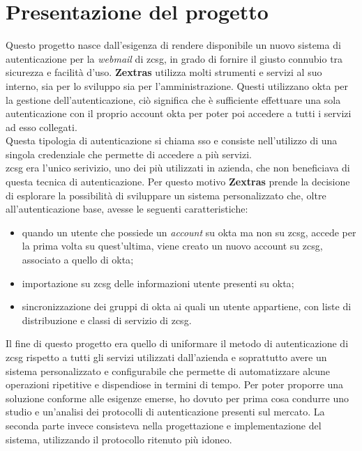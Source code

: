 \newpage

\section{Presentazione del progetto}\label{sec:progetto}
    Questo progetto nasce dall'esigenza di rendere disponibile un nuovo sistema di autenticazione per la \textit{webmail} di \gls{zcsg}, in grado di fornire il giusto connubio tra sicurezza e facilità d'uso. \textbf{Zextras} utilizza molti strumenti e servizi al suo interno, sia per lo sviluppo sia per l'amministrazione. Questi utilizzano \gls{okta} per la gestione dell'autenticazione, ciò significa che è sufficiente effettuare una sola autenticazione con il proprio account \gls{okta} per poter poi accedere a tutti i servizi ad esso collegati. \\
    Questa tipologia di autenticazione si chiama \gls{sso} e consiste nell'utilizzo di una singola credenziale che permette di accedere a più servizi. \\
    \gls{zcsg} era l'unico serivizio, uno dei più utilizzati in azienda, che non beneficiava di questa tecnica di autenticazione. Per questo motivo \textbf{Zextras} prende la decisione di esplorare la possibilità di sviluppare un sistema personalizzato che, oltre all'autenticazione base, avesse le seguenti caratteristiche:
    \begin{itemize}
        \item quando un utente che possiede un \textit{account} su \gls{okta} ma non su \gls{zcsg}, accede per la prima volta su quest'ultima, viene creato un nuovo account su \gls{zcsg}, associato a quello di \gls{okta};
        \item importazione su \gls{zcsg} delle informazioni utente presenti su \gls{okta};
        \item sincronizzazione dei gruppi di \gls{okta} ai quali un utente appartiene, con liste di distribuzione e classi di servizio di \gls{zcsg}.
    \end{itemize}
    Il fine di questo progetto era quello di uniformare il metodo di autenticazione di \gls{zcsg} rispetto a tutti gli servizi utilizzati dall'azienda e soprattutto avere un sistema personalizzato e configurabile che permette di automatizzare alcune operazioni ripetitive e dispendiose in termini di tempo.
    Per poter proporre una soluzione conforme alle esigenze emerse, ho dovuto per prima cosa condurre uno studio e un'analisi dei protocolli di autenticazione presenti sul mercato. La seconda parte invece consisteva nella progettazione e implementazione del sistema, utilizzando il protocollo ritenuto più idoneo.
    
